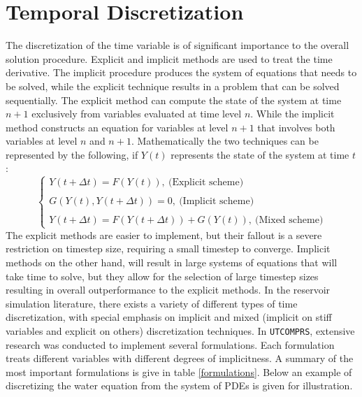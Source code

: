 \section{Temporal Discretization}
The discretization of the time variable is of significant importance to the overall solution procedure.
Explicit and implicit methods are used to treat the time derivative. The implicit procedure produces the 
system of equations that needs to be solved, while the explicit technique results in a problem that can be
solved sequentially. The explicit method can compute the state of the system at time $n+1$ exclusively from 
variables evaluated at time level $n$. While the implicit method constructs an equation for variables at level
$n+1$ that involves both variables at level $n$ and $n+1$. Mathematically the two techniques can be represented by 
the following, if $Y(t)$ represents the state of the system at time $t$:
\begingroup\makeatletter\def\f@size{12}\check@mathfonts
\begin{equation}
	\begin{cases}
		Y(t+\Delta t) = F(Y(t)), \ \text{(Explicit scheme)}\\\\
		G(Y(t), Y(t+\Delta t)) = 0, \ \text{(Implicit scheme)}\\\\
		Y(t+\Delta t) = F(Y(t+\Delta t)) + G(Y(t)), \ \text{(Mixed scheme)}
	\end{cases}
\end{equation}\endgroup
The explicit methods are easier to implement, but their fallout is a severe restriction on timestep size, 
requiring a small timestep to converge. Implicit methods on the other hand, will result in large systems of 
equations that will take time to solve, but they allow for the selection of large timestep sizes resulting in 
overall outperformance to the explicit methods. In the reservoir simulation literature, there exists a variety of
different types of time discretization, with special emphasis on implicit and mixed (implicit on stiff variables and explicit on others) 
discretization techniques. In \texttt{UTCOMPRS}, extensive research was conducted to implement several formulations. Each formulation treats
different variables with different degrees of implicitness. A summary of the most important formulations is give in table \ref{formulations}.
Below an example of discretizing the water equation from the system of PDEs is given for illustration.

